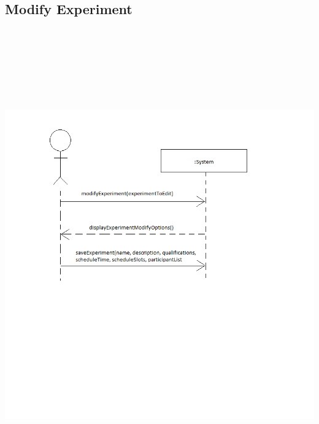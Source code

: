 \subsection{Modify Experiment}
\includegraphics[height=8in]{../other/System-Sequence-diagrams/modify-experiment.png}
